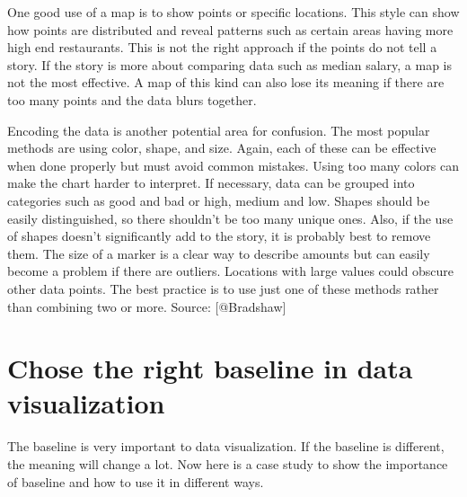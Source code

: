 \documentclass[]{book}
\theoremstyle{definition}
\theoremstyle{definition}
\theoremstyle{definition}
\theoremstyle{remark}
\begin{document}
One good use of a map is to show points or specific locations. This
style can show how points are distributed and reveal patterns such as
certain areas having more high end restaurants. This is not the right
approach if the points do not tell a story. If the story is more about
comparing data such as median salary, a map is not the most effective. A
map of this kind can also lose its meaning if there are too many points
and the data blurs together.

Encoding the data is another potential area for confusion. The most
popular methods are using color, shape, and size. Again, each of these
can be effective when done properly but must avoid common mistakes.
Using too many colors can make the chart harder to interpret. If
necessary, data can be grouped into categories such as good and bad or
high, medium and low. Shapes should be easily distinguished, so there
shouldn't be too many unique ones. Also, if the use of shapes doesn't
significantly add to the story, it is probably best to remove them. The
size of a marker is a clear way to describe amounts but can easily
become a problem if there are outliers. Locations with large values
could obscure other data points. The best practice is to use just one of
these methods rather than combining two or more. Source: {[}@Bradshaw{]}

\section{Chose the right baseline in data
visualization}\label{chose-the-right-baseline-in-data-visualization}

The baseline is very important to data visualization. If the baseline is
different, the meaning will change a lot. Now here is a case study to
show the importance of baseline and how to use it in different ways.
\end{document}
